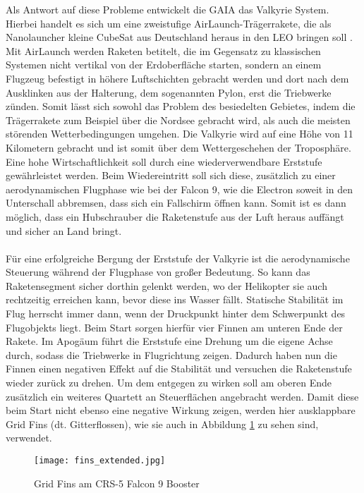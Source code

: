 Als Antwort auf diese Probleme entwickelt die \gls{GAIA} das Valkyrie System. Hierbei handelt es sich um eine zweistufige AirLaunch-Trägerrakete, die als  Nanolauncher kleine CubeSat aus Deutschland heraus in den LEO bringen soll \cite{GAIA}. Mit AirLaunch werden Raketen betitelt, die im Gegensatz zu klassischen Systemen nicht vertikal von der Erdoberfläche starten, sondern an einem Flugzeug befestigt in höhere Luftschichten gebracht werden und dort nach dem Ausklinken aus der Halterung, dem sogenannten Pylon, erst die Triebwerke zünden. Somit lässt sich sowohl das Problem des besiedelten Gebietes, indem die Trägerrakete zum Beispiel über die Nordsee gebracht wird, als auch die meisten störenden Wetterbedingungen umgehen. Die Valkyrie wird auf eine Höhe von 11 Kilometern gebracht \cite{flugbahnBarz} und ist somit über dem Wettergeschehen der Troposphäre. Eine hohe Wirtschaftlichkeit soll durch eine wiederverwendbare Erststufe gewährleistet werden. Beim Wiedereintritt soll sich diese, zusätzlich zu einer aerodynamischen Flugphase wie bei der Falcon 9, wie die Electron soweit in den Unterschall abbremsen, dass sich ein Fallschirm öffnen kann. Somit ist es dann möglich, dass ein Hubschrauber die Raketenstufe aus der Luft heraus auffängt und sicher an Land bringt.
\\~\\
Für eine erfolgreiche Bergung der Erststufe der Valkyrie ist die aerodynamische Steuerung während der Flugphase von großer Bedeutung. So kann das Raketensegment sicher dorthin gelenkt werden, wo der Helikopter sie auch rechtzeitig erreichen kann, bevor diese ins Wasser fällt. Statische Stabilität im Flug herrscht immer dann, wenn der Druckpunkt hinter dem Schwerpunkt des Flugobjekts liegt. Beim Start sorgen hierfür vier Finnen am unteren Ende der Rakete. Im Apogäum führt die Erststufe eine Drehung um die eigene Achse durch, sodass die Triebwerke in Flugrichtung zeigen. Dadurch haben nun die Finnen einen negativen Effekt auf die Stabilität und versuchen die Raketenstufe wieder zurück zu drehen. Um dem entgegen zu wirken soll am oberen Ende zusätzlich ein weiteres Quartett an Steuerflächen angebracht werden. Damit diese beim Start nicht ebenso eine negative Wirkung zeigen, werden hier ausklappbare Grid Fins (dt. Gitterflossen), wie sie auch in Abbildung \ref{abb_f9_GF} zu sehen sind, verwendet.

\begin{figure}[h]
	\centering
	\texttt{[image: fins\_extended.jpg]}
	\begin{flushright}
	\end{flushright}
	\caption{Grid Fins am CRS-5 Falcon 9 Booster}
	\label{abb_f9_GF}
\end{figure}

